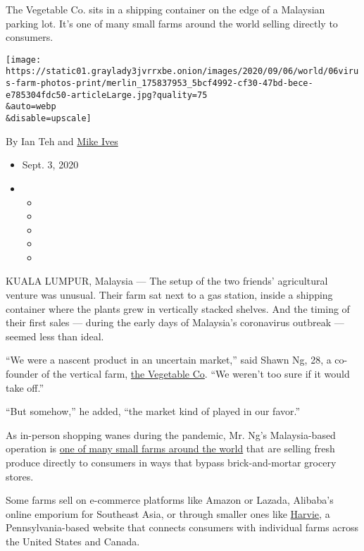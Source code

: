 The Vegetable Co. sits in a shipping container on the edge of a
Malaysian parking lot. It's one of many small farms around the world
selling directly to consumers.

\texttt{[image: https://static01.graylady3jvrrxbe.onion/images/2020/09/06/world/06virus-farm-photos-print/merlin\_175837953\_5bcf4992-cf30-47bd-bece-e785304fdc50-articleLarge.jpg?quality=75\\\&auto=webp\\\&disable=upscale]}

By Ian Teh and
\href{https://www.nytimes3xbfgragh.onion/by/mike-ives}{Mike Ives}

\begin{itemize}
\item
  Sept. 3, 2020
\item
  \begin{itemize}
  \item
  \item
  \item
  \item
  \item
  \end{itemize}
\end{itemize}

KUALA LUMPUR, Malaysia --- The setup of the two friends' agricultural
venture was unusual. Their farm sat next to a gas station, inside a
shipping container where the plants grew in vertically stacked shelves.
And the timing of their first sales --- during the early days of
Malaysia's coronavirus outbreak --- seemed less than ideal.

``We were a nascent product in an uncertain market,'' said Shawn Ng, 28,
a co-founder of the vertical farm,
\href{https://www.facebookcorewwwi.onion/thevegetable.co/about/?ref=page_internal}{the
Vegetable Co}. ``We weren't too sure if it would take off.''

``But somehow,'' he added, ``the market kind of played in our favor.''

As in-person shopping wanes during the pandemic, Mr. Ng's Malaysia-based
operation is
\href{https://www.nytimes3xbfgragh.onion/2020/05/08/nyregion/small-farms-ny-coronavirus.html}{one
of many small farms around the world} that are selling fresh produce
directly to consumers in ways that bypass brick-and-mortar grocery
stores.

Some farms sell on e-commerce platforms like Amazon or Lazada, Alibaba's
online emporium for Southeast Asia, or through smaller ones like
\href{https://www.harvie.farm/}{Harvie}, a Pennsylvania-based website
that connects consumers with individual farms across the United States
and Canada.

